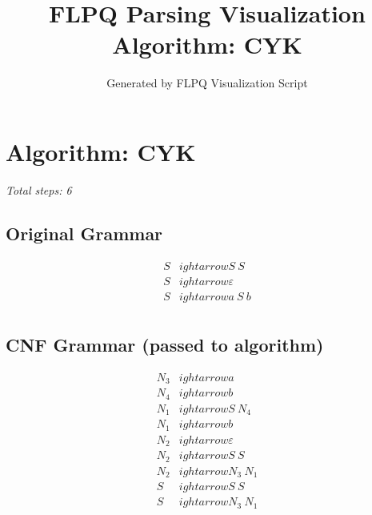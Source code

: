 \documentclass[12pt]{article}
\title{FLPQ Parsing Visualization\\Algorithm: CYK}
\author{Generated by FLPQ Visualization Script}
\date{}
\begin{document}
\maketitle
\tableofcontents

\section*{Algorithm: CYK}
\textit{Total steps: 6}\\
\subsection*{Original Grammar}
\begin{center}
\[
\begin{align*}S &
ightarrow S\ S \\
S &
ightarrow \varepsilon \\
S &
ightarrow a\ S\ b \\
\end{align*}
\]
\end{center}

\subsection*{CNF Grammar (passed to algorithm)}
\begin{center}
\[
\begin{align*}N_{3} &
ightarrow a \\
N_{4} &
ightarrow b \\
N_{1} &
ightarrow S\ N_{4} \\
N_{1} &
ightarrow b \\
N_{2} &
ightarrow \varepsilon \\
N_{2} &
ightarrow S\ S \\
N_{2} &
ightarrow N_{3}\ N_{1} \\
S &
ightarrow S\ S \\
S &
ightarrow N_{3}\ N_{1} \\
\end{align*}
\]
\end{center}
\end{document}
